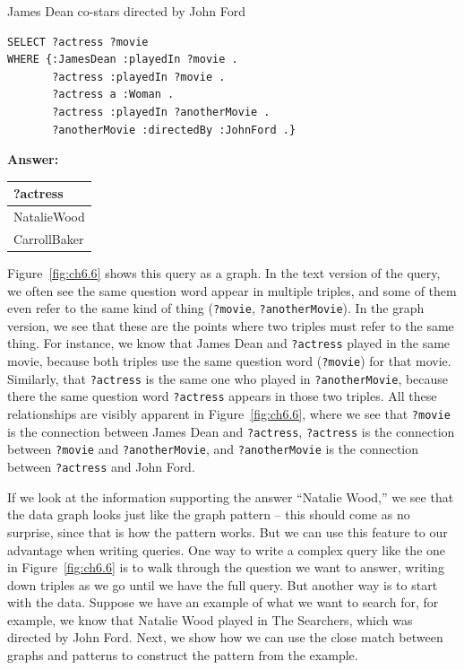 \begin{query}James Dean co-stars directed by John Ford\end{query}
\begin{lstlisting}
SELECT ?actress ?movie
WHERE {:JamesDean :playedIn ?movie .
       ?actress :playedIn ?movie .
       ?actress a :Woman .
       ?actress :playedIn ?anotherMovie .
       ?anotherMovie :directedBy :JohnFord .}
\end{lstlisting}

\textbf{\textbf{Answer:}}

\begin{tabular}{|l|}
\hline
?actress\\
\hline
NatalieWood\\
CarrollBaker\\
\hline
\end{tabular}

Figure~\ref{fig:ch6.6} shows this query as a graph. In the text version of the
query, we often see the same question word appear in multiple triples,
and some of them even refer to the same kind of thing (\texttt{?movie},
\texttt{?anotherMovie}). In the graph version, we see that these are the points
where two triples must refer to the same thing. For instance, we know
that James Dean and \texttt{?actress} played in the same movie, because both
triples use the same question word (\texttt{?movie}) for that movie. Similarly,
that \texttt{?actress} is the same one who played in \texttt{?anotherMovie}, because there
the same question word \texttt{?actress} appears in those two triples. All these
relationships are visibly apparent in Figure~\ref{fig:ch6.6}, where we see that
\texttt{?movie} is the connection between James Dean and \texttt{?actress}, \texttt{?actress} is
the connection between \texttt{?movie} and \texttt{?anotherMovie}, and \texttt{?anotherMovie} is
the connection between \texttt{?actress} and John Ford.

If we look at the information supporting the answer ``Natalie Wood,'' we
see that the data graph looks just like the graph pattern -- this should
come as no surprise, since that is how the pattern works. But we can use
this feature to our advantage when writing queries. One way to write a
complex query like the one in Figure~\ref{fig:ch6.6} is to walk through the question
we want to answer, writing down triples as we go until we have the full query. But another way is to start with the
data. Suppose we have an example of what we want to search for, for
example, we know that Natalie Wood played in The Searchers, which was
directed by John Ford. Next, we show how we can use the close match
between graphs and patterns to construct the pattern from the example.


